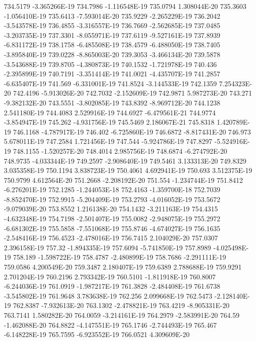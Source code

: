 734.5179  -3.365266E-19
734.7986  -1.116548E-19
735.0794  1.308044E-20
735.3603  -1.056410E-19
735.6413  -7.593014E-20
735.9229  -2.265229E-19
736.2042  -3.543578E-19
736.4855  -3.316557E-19
736.7669  -2.562685E-19
737.0485  -3.203735E-19
737.3301  -8.055971E-19
737.6119  -9.527161E-19
737.8939  -6.831172E-19
738.1758  -6.485508E-19
738.4579  -6.488050E-19
738.7405  -3.895840E-19
739.0228  -8.865003E-20
739.3053  -3.466134E-20
739.5878  -3.543688E-19
739.8705  -4.380873E-19
740.1532  -1.721978E-19
740.436  -2.395899E-19
740.7191  -3.351414E-19
741.0021  -4.435707E-19
741.2857  -6.635407E-19
741.569  -6.331001E-19
741.8524  -3.144533E-19
742.1359  7.254323E-20
742.4196  -5.913026E-20
742.7032  -2.152609E-19
742.9871  5.987273E-20
743.271  -9.382132E-20
743.5551  -3.802085E-19
743.8392  -8.969712E-20
744.1238  2.541180E-19
744.4083  2.529916E-19
744.6927  -6.479561E-21
744.9774  -3.854947E-19
745.262  -4.931756E-19
745.5469  2.186067E-21
745.8318  1.420789E-19
746.1168  -4.787917E-19
746.402  -6.725860E-19
746.6872  -8.817431E-20
746.973  5.678011E-19
747.2584  1.721456E-19
747.544  -5.924786E-19
747.8297  -5.524916E-19
748.1155  -1.520257E-20
748.4014  2.985756E-19
748.6874  -6.274792E-20
748.9735  -4.033344E-19
749.2597  -2.908640E-19
749.5461  3.133313E-20
749.8329  3.035358E-19
750.1194  3.838723E-19
750.4061  4.692941E-19
750.693  3.512375E-19
750.9799  4.612564E-20
751.2668  -2.208192E-20
751.554  -1.234744E-19
751.8412  -6.276201E-19
752.1285  -1.244053E-18
752.4163  -1.359700E-18
752.7039  -8.852470E-19
752.9915  -5.204409E-19
753.2793  -4.016052E-19
753.5672  -9.079039E-20
753.8552  1.216138E-20
754.1432  -3.211163E-19
754.4315  -4.632348E-19
754.7198  -2.501407E-19
755.0082  -2.948075E-19
755.2972  -6.681302E-19
755.5858  -7.551068E-19
755.8746  -4.674027E-19
756.1635  -2.548416E-19
756.4523  -2.478016E-19
756.7415  2.104029E-20
757.0307  2.396158E-19
757.32  -1.894335E-19
757.6094  -5.741850E-19
757.8989  -4.025498E-19
758.189  -1.598722E-19
758.4787  -2.480899E-19
758.7686  -2.291111E-19
759.0586  4.200549E-20
759.3487  2.180407E-19
759.6389  2.788688E-19
759.9291  2.701204E-19
760.2196  2.793342E-19
760.5101  -1.811918E-19
760.8007  -6.244036E-19
761.0919  -1.987217E-19
761.3828  -2.484408E-19
761.6738  -3.545802E-19
761.9648  3.783638E-19
762.256  2.099668E-19
762.5473  -2.128140E-19
762.8387  -7.932613E-20
763.1302  -2.478821E-19
763.4219  -8.905331E-20
763.7141  1.580282E-20
764.0059  -3.214161E-19
764.2979  -2.583991E-20
764.59  -1.462088E-20
764.8822  -4.147551E-19
765.1746  -2.744493E-19
765.467  -6.148228E-19
765.7595  -6.923552E-19
766.0521  4.309609E-20
